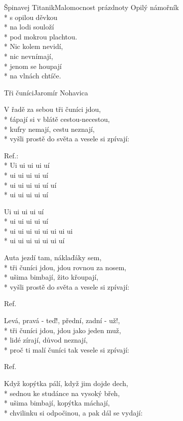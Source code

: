\documentclass[10.5pt]{book}
\begin{document}
\begin{poem}{Špinavej Titanik}{Malomocnost prázdnoty}
Opilý námořník\\*
s opilou děvkou\\*
na lodi souloží\\*
pod mokrou plachtou.\\*
Nic kolem nevidí,\\*
nic nevnímají,\\*
jenom se houpají\\*
na vlnách chtíče.

\end{poem}

\begin{poem}{Tři čuníci}{Jaromír Nohavica}

\settowidth{\versewidth}{vyšli prostě do světa a vesele si zpívají:}

V řadě za sebou tři čuníci jdou,\\*
ťápají si v blátě cestou-necestou,\\*
kufry nemají, cestu neznají,\\*
vyšli prostě do světa a vesele si zpívají: 

Ref.:\\*
Ui ui ui ui uí\\*
ui ui ui ui uí\\*
ui ui ui ui uí uí\\*
ui ui ui ui uí

Ui ui ui ui uí\\*
ui ui ui ui uí\\*
ui ui ui ui ui ui ui ui\\*
ui ui ui ui ui ui uí

Auta jezdí tam, náklaďáky sem,\\*
tři čuníci jdou, jdou rovnou za nosem,\\*
ušima bimbají, žito křoupají,\\*
vyšli prostě do světa a vesele si zpívají: 

Ref.

Levá, pravá - teď!, přední, zadní - už!,\\*
tři čuníci jdou, jdou jako jeden muž,\\*
lidé zírají, důvod neznají,\\*
proč ti malí čuníci tak vesele si zpívají: 

Ref.

Když kopýtka pálí, když jim dojde dech,\\*
sednou ke studánce na vysoký břeh,\\*
ušima bimbají, kopýtka máchají,\\*
chvilinku si odpočinou, a pak dál se vydají: 


\end{poem}
\end{document}

